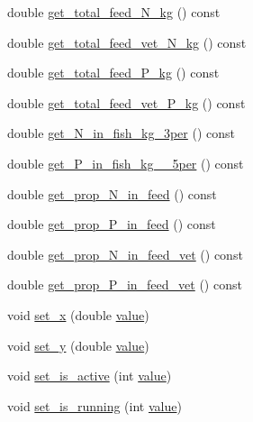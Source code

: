 \begin{DoxyCompactItemize}
\item 
double \mbox{\hyperlink{class_fishfarm_af0bf5568a2ae439add36edb11c4e1164}{get\+\_\+total\+\_\+feed\+\_\+\+N\+\_\+kg}} () const
\item 
double \mbox{\hyperlink{class_fishfarm_af2a9f5a448e14cf9155acb1927323adf}{get\+\_\+total\+\_\+feed\+\_\+vet\+\_\+\+N\+\_\+kg}} () const
\item 
double \mbox{\hyperlink{class_fishfarm_af75da4df1fecb171d1f0721d04526ce8}{get\+\_\+total\+\_\+feed\+\_\+\+P\+\_\+kg}} () const
\item 
double \mbox{\hyperlink{class_fishfarm_a74ad4556f4f93a0fac8d90969f35a023}{get\+\_\+total\+\_\+feed\+\_\+vet\+\_\+\+P\+\_\+kg}} () const
\item 
double \mbox{\hyperlink{class_fishfarm_a4e29ff83cc1fa7db74ea75d4e04f3ee5}{get\+\_\+\+N\+\_\+in\+\_\+fish\+\_\+kg\+\_\+3per}} () const
\item 
double \mbox{\hyperlink{class_fishfarm_a414e980219c631fc1e00160143fa148e}{get\+\_\+\+P\+\_\+in\+\_\+fish\+\_\+kg\+\_\+\_\+5per}} () const
\item 
double \mbox{\hyperlink{class_fishfarm_a6737538056c4615cdfe7be7d1881e01b}{get\+\_\+prop\+\_\+\+N\+\_\+in\+\_\+feed}} () const
\item 
double \mbox{\hyperlink{class_fishfarm_ac40656b26ce0fa91890a41290dee5dbe}{get\+\_\+prop\+\_\+\+P\+\_\+in\+\_\+feed}} () const
\item 
double \mbox{\hyperlink{class_fishfarm_a5a9f7bd7cdcfb56233671cd5f9c121b0}{get\+\_\+prop\+\_\+\+N\+\_\+in\+\_\+feed\+\_\+vet}} () const
\item 
double \mbox{\hyperlink{class_fishfarm_ad883c56f014dd2ae439d4eee3bec7203}{get\+\_\+prop\+\_\+\+P\+\_\+in\+\_\+feed\+\_\+vet}} () const
\item 
void \mbox{\hyperlink{class_fishfarm_a4e8dfe97692937fd4fb70df9ca108548}{set\+\_\+x}} (double \mbox{\hyperlink{diffusion_8cpp_a4b41795815d9f3d03abfc739e666d5da}{value}})
\item 
void \mbox{\hyperlink{class_fishfarm_acf2984bccb511f51e2f17e1ccd70355c}{set\+\_\+y}} (double \mbox{\hyperlink{diffusion_8cpp_a4b41795815d9f3d03abfc739e666d5da}{value}})
\item 
void \mbox{\hyperlink{class_fishfarm_ac7b440c993ed7d0bcf4e6853129f722d}{set\+\_\+is\+\_\+active}} (int \mbox{\hyperlink{diffusion_8cpp_a4b41795815d9f3d03abfc739e666d5da}{value}})
\item 
void \mbox{\hyperlink{class_fishfarm_aaebc35e12a8370ef3bc03e4bcff9cbfc}{set\+\_\+is\+\_\+running}} (int \mbox{\hyperlink{diffusion_8cpp_a4b41795815d9f3d03abfc739e666d5da}{value}})

\end{DoxyCompactItemize}
